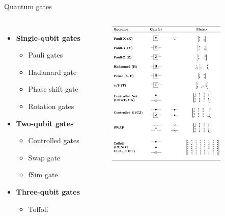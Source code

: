 \documentclass[aspectratio=169, 10pt, xcolor={svgnames}, hyperref={linkcolor=black}]{beamer}
\begin{document}
\begin{frame}{Quantum gates}

   \begin{columns}

     \column{6cm}
     \begin{itemize}
       \item {\bf Single-qubit gates}
       \begin{itemize}
         \item Pauli gates
         \item Hadamard gate
         \item Phase shift gate
         \item Rotation gates
       \end{itemize}
       \item {\bf Two-qubit gates}
       \begin{itemize}
         \item Controlled gates
         \item Swap gate
         \item fSim gate
       \end{itemize}
       \item \textbf{Three-qubit gates}
       \begin{itemize}
         \item Toffoli
       \end{itemize}
     \end{itemize}

     \column{6cm}
     \begin{figure}
       \includegraphics[height=7cm]{figures/Quantum_Logic_Gates.png}
     \end{figure}

   \end{columns}

 \end{frame}
\end{document}
